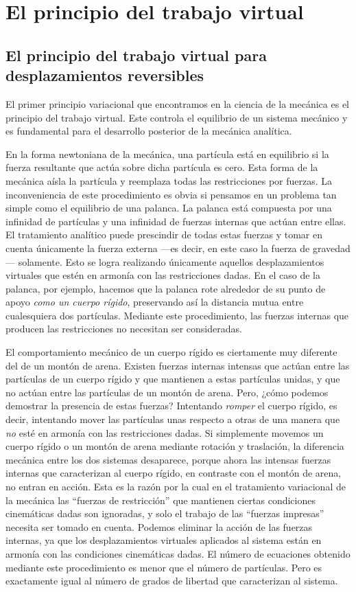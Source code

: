 \chapter{El principio del trabajo virtual}

\section{El principio del trabajo virtual para desplazamientos reversibles}

El primer principio variacional que encontramos en la ciencia de la mecánica es el principio del trabajo virtual. Este controla el equilibrio de un sistema mecánico y es fundamental para el desarrollo posterior de la mecánica analítica.

En la forma newtoniana de la mecánica, una partícula está en equilibrio si la fuerza resultante que actúa sobre dicha partícula es cero. Esta forma de la mecánica aísla la partícula y reemplaza todas las restricciones por fuerzas. La inconveniencia de este procedimiento es obvia si pensamos en un problema tan simple como el equilibrio de una palanca. La palanca está compuesta por una infinidad de partículas y una infinidad de fuerzas internas que actúan entre ellas. El tratamiento analítico puede prescindir de todas estas fuerzas y tomar en cuenta únicamente la fuerza externa ---es decir, en este caso la fuerza de gravedad--- solamente. Esto se logra realizando únicamente aquellos desplazamientos virtuales que estén en armonía con las restricciones dadas. En el caso de la palanca, por ejemplo, hacemos que la palanca rote alrededor de su punto de apoyo \emph{como un cuerpo rígido}, preservando así la distancia mutua entre cualesquiera dos partículas. Mediante este procedimiento, las fuerzas internas que producen las restricciones no necesitan ser consideradas.

El comportamiento mecánico de un cuerpo rígido es ciertamente muy diferente del de un montón de arena. Existen fuerzas internas intensas que actúan entre las partículas de un cuerpo rígido y que mantienen a estas partículas unidas, y que no actúan entre las partículas de un montón de arena. Pero, ¿cómo podemos demostrar la presencia de estas fuerzas? Intentando \emph{romper} el cuerpo rígido, es decir, intentando mover las partículas unas respecto a otras de una manera que \emph{no} esté en armonía con las restricciones dadas. Si simplemente movemos un cuerpo rígido o un montón de arena mediante rotación y traslación, la diferencia mecánica entre los dos sistemas desaparece, porque ahora las intensas fuerzas internas que caracterizan al cuerpo rígido, en contraste con el montón de arena, no entran en acción. Esta es la razón por la cual en el tratamiento variacional de la mecánica las ``fuerzas de restricción'' que mantienen ciertas condiciones cinemáticas dadas son ignoradas, y solo el trabajo de las ``fuerzas impresas'' necesita ser tomado en cuenta. Podemos eliminar la acción de las fuerzas internas, ya que los desplazamientos virtuales aplicados al sistema están en armonía con las condiciones cinemáticas dadas. El número de ecuaciones obtenido mediante este procedimiento es menor que el número de partículas. Pero es exactamente igual al número de grados de libertad que caracterizan al sistema.

